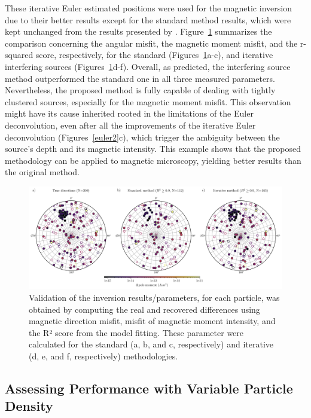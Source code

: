 These iterative Euler estimated positions were used for the magnetic inversion due to their better results except for the standard method results, which were kept unchanged from the results presented by \citet{Souza-Junior2024}. Figure~\ref{inversion2} summarizes the comparison concerning the angular misfit, the magnetic moment misfit, and the r-squared score, respectively, for the standard (Figures~\ref{inversion2}a-c), and iterative interfering sources (Figures~\ref{inversion2}d-f). Overall, as predicted, the interfering source method outperformed the standard one in all three measured parameters. Nevertheless, the proposed method is fully capable of dealing with tightly clustered sources, especially for the magnetic moment misfit. This observation might have its cause inherited rooted in the limitations of the Euler deconvolution, even after all the improvements of the iterative Euler deconvolution (Figures~\ref{euler2}c), which trigger the ambiguity between the source's depth and its magnetic intensity. This example shows that the proposed methodology can be applied to magnetic microscopy, yielding better results than the original method.


\begin{figure}[tb!]
  \centering
  \includegraphics[width=1\linewidth]{paper/figures/synthetic-data-stereograms-comparison.png}
  \caption{Validation of the inversion results/parameters, for each particle, was obtained by computing the real and recovered differences using magnetic direction misfit, misfit of magnetic moment intensity, and the R² score from the model fitting. These parameter were calculated for the standard (a, b, and c, respectively) and iterative (d, e, and f, respectively) methodologies.}
  \label{inversion2}
\end{figure}



\subsection{Assessing Performance with Variable Particle Density}

